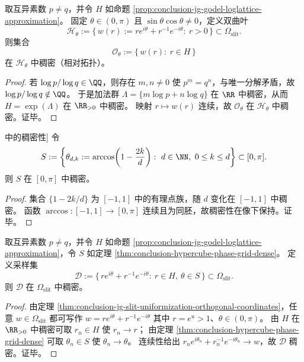 \begin{theorem}\label{thm:conclusion-jg-godel-dense-orbits-on-hyperbola-leaf}
取互异素数 \(p\neq q\)，并令 \(H\) 如命题 \ref{prop:conclusion-jg-godel-loglattice-approximation}。
固定 \(\theta\in(0,\pi)\) 且 \(\sin\theta\cos\theta\neq 0\)，定义双曲叶
\[
\mathcal H_{\theta}:=\{\,w(r):=r e^{i\theta}+r^{-1}e^{-i\theta}:\ r>0\,\}\subset\Omega_{\mathrm{slit}}.
\]
则集合
\[
\mathcal O_{\theta}:=\{\,w(r):\ r\in H\,\}
\]
在 \(\mathcal H_{\theta}\) 中稠密（相对拓扑）。
\end{theorem}
\begin{proof}
若 \(\log p/\log q\in\QQ\)，则存在 \(m,n\neq 0\) 使 \(p^m=q^n\)，与唯一分解矛盾，故 \(\log p/\log q\notin\QQ\)。
于是加法群 \(\Lambda=\{m\log p+n\log q\}\) 在 \(\RR\) 中稠密，从而 \(H=\exp(\Lambda)\) 在 \(\RR_{>0}\) 中稠密。
映射 \(r\mapsto w(r)\) 连续，故 \(\mathcal O_\theta\) 在 \(\mathcal H_\theta\) 中稠密。证毕。
\end{proof}

\begin{theorem}[有理余弦网格在 \([0,\pi]\) 中的稠密性]\label{thm:conclusion-hypercube-phase-grid-dense}
令
\[
S:=\left\{\theta_{d,k}:=\arccos\!\left(1-\frac{2k}{d}\right):\ d\in\NN,\ 0\le k\le d\right\}\subset[0,\pi].
\]
则 \(S\) 在 \([0,\pi]\) 中稠密。
\end{theorem}
\begin{proof}
集合 \(\{1-2k/d\}\) 为 \([-1,1]\) 中的有理点族，随 \(d\) 变化在 \([-1,1]\) 中稠密。
函数 \(\arccos:[-1,1]\to[0,\pi]\) 连续且为同胚，故稠密性在像下保持。证毕。
\end{proof}

\begin{theorem}\label{thm:conclusion-jg-godel-hypercube-dense-sampling-omega}
取互异素数 \(p\neq q\)，并令 \(H\) 如命题 \ref{prop:conclusion-jg-godel-loglattice-approximation}，令 \(S\) 如定理 \ref{thm:conclusion-hypercube-phase-grid-dense}。
定义采样集
\[
\mathcal D:=\{\,r e^{i\theta}+r^{-1}e^{-i\theta}:\ r\in H,\ \theta\in S\,\}\subset\Omega_{\mathrm{slit}}.
\]
则 \(\mathcal D\) 在 \(\Omega_{\mathrm{slit}}\) 中稠密。
\end{theorem}
\begin{proof}
由定理 \ref{thm:conclusion-jg-slit-uniformization-orthogonal-coordinates}，任意 \(w\in\Omega_{\mathrm{slit}}\) 都可写作
\(
w=r e^{i\theta}+r^{-1}e^{-i\theta}
\)
其中 \(r=e^{u}>1\)、\(\theta\in(0,\pi)\)。
由 \(H\) 在 \(\RR_{>0}\) 中稠密可取 \(r_n\in H\) 使 \(r_n\to r\)；
由定理 \ref{thm:conclusion-hypercube-phase-grid-dense} 可取 \(\theta_n\in S\) 使 \(\theta_n\to\theta\)。
连续性给出
\(
r_n e^{i\theta_n}+r_n^{-1}e^{-i\theta_n}\to w
\)，故 \(\mathcal D\) 稠密。证毕。
\end{proof}

